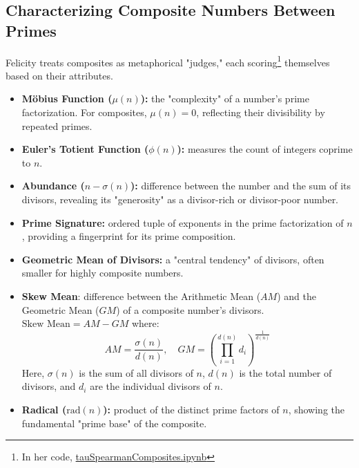 \subsection*{Characterizing Composite Numbers Between Primes}

Felicity treats composites as metaphorical "judges," each scoring\footnote{In her code, \href{https://colab.research.google.com/drive/1OQ0cHEhsAsPyH5WV1FMA9mu-05I7DJRa?usp=sharing}{tauSpearmanComposites.ipynb}} themselves based on their attributes.



\begin{itemize}
    \item \textbf{Möbius Function (\(\mu(n)\)):} the "complexity" of a number’s prime factorization. For composites, \(\mu(n) = 0\), reflecting their divisibility by repeated primes.
    \item \textbf{Euler’s Totient Function (\(\phi(n)\)):} measures the count of integers coprime to \(n\).
    \item \textbf{Abundance (\(n - \sigma(n)\)):} difference between the number and the sum of its divisors, revealing its "generosity" as a divisor-rich or divisor-poor number.
    \item \textbf{Prime Signature:} ordered tuple of exponents in the prime factorization of \(n\), providing a fingerprint for its prime composition.

    \item \textbf{Geometric Mean of Divisors:} 
    a "central tendency" of divisors, often smaller for highly composite numbers.
    
    \item \textbf{Skew Mean}: difference between the Arithmetic Mean (\(AM\)) and the Geometric Mean (\(GM\)) of a composite number's divisors. \( \text{Skew Mean} = AM - GM\) where:
\[
AM = \frac{\sigma(n)}{d(n)}, \quad GM = \left( \prod_{i=1}^{d(n)} d_i \right)^{\frac{1}{d(n)}}
\]
Here, \(\sigma(n)\) is the sum of all divisors of \(n\), \(d(n)\) is the total number of divisors, and \(d_i\) are the individual divisors of \(n\). 
    \item \textbf{Radical (\(\text{rad}(n)\)):} product of the distinct prime factors of \(n\), showing the fundamental "prime base" of the composite.
\end{itemize}


